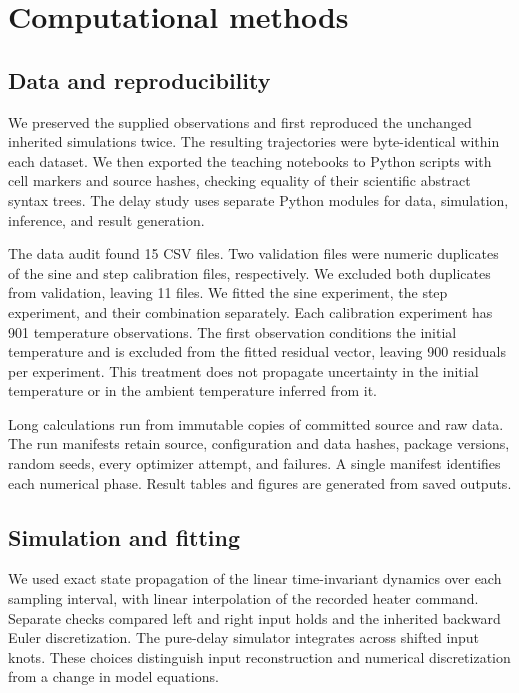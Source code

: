 \section{Computational methods}
\label{sec:methods}

\subsection{Data and reproducibility}
We preserved the supplied observations and first reproduced the unchanged
inherited simulations twice. The resulting trajectories were byte-identical
within each dataset. We then exported the teaching notebooks to Python scripts
with cell markers and source hashes, checking equality of their scientific
abstract syntax trees. The delay study uses separate Python modules for data,
simulation, inference, and result generation.

The data audit found 15 CSV files. Two validation files were numeric duplicates
of the sine and step calibration files, respectively. We excluded both duplicates
from validation, leaving 11 files. We fitted the sine experiment, the step
experiment, and their combination separately. Each calibration experiment has
901 temperature observations. The first observation conditions the initial
temperature and is excluded from the fitted residual vector, leaving 900
residuals per experiment. This treatment does not propagate uncertainty in the
initial temperature or in the ambient temperature inferred from it.

Long calculations run from immutable copies of committed source and raw data.
The run manifests retain source, configuration and data hashes, package versions,
random seeds, every optimizer attempt, and failures. A single manifest identifies
each numerical phase. Result tables and figures are generated from saved outputs.

\subsection{Simulation and fitting}
We used exact state propagation of the linear time-invariant dynamics over each
sampling interval, with linear interpolation of the recorded heater command.
Separate checks compared left and right input holds and the inherited backward
Euler discretization. The pure-delay simulator integrates across shifted input
knots. These choices distinguish input reconstruction and numerical discretization
from a change in model equations.

